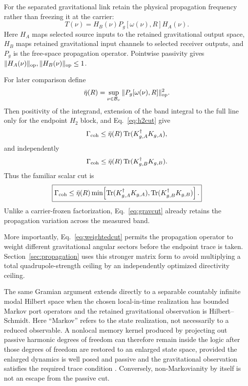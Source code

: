 For the separated gravitational link retain the physical propagation frequency rather than freezing it at the carrier:
\begin{equation}
T(\nu)=H_B(\nu)P_g[\omega(\nu),R]H_A(\nu).
\label{eq:factor}
\end{equation}
Here $H_A$ maps selected source inputs to the retained gravitational output space, $H_B$ maps retained gravitational input channels to selected receiver outputs, and $P_g$ is the free-space propagation operator. Pointwise passivity gives $\|H_A(\nu)\|_{\mathrm{op}},\|H_B(\nu)\|_{\mathrm{op}}\le1$.

For later comparison define
\begin{equation}
\bar\eta(R)
=\sup_{\nu\in\mathcal B_\nu}
\|P_g[\omega(\nu),R]\|_{\mathrm{op}}^2 .
\end{equation}
Then positivity of the integrand, extension of the band integral to the full line only for the endpoint $H_2$ block, and Eq.~\eqref{eq:h2cut} give
\begin{equation}
\Gamma_{\rm coh}
\le
\bar\eta(R)\operatorname{Tr}(K_{g,A}^\dagger K_{g,A}),
\end{equation}
and independently
\begin{equation}
\Gamma_{\rm coh}
\le
\bar\eta(R)\operatorname{Tr}(K_{g,B}^\dagger K_{g,B}).
\end{equation}
Thus the familiar scalar cut is
\begin{equation}
\boxed{
\Gamma_{\rm coh}
\le
\bar\eta(R)
\min\!\left[
\operatorname{Tr}(K_{g,A}^\dagger K_{g,A}),
\operatorname{Tr}(K_{g,B}^\dagger K_{g,B})
\right].
}
\label{eq:gravcut}
\end{equation}
Unlike a carrier-frozen factorization, Eq.~\eqref{eq:gravcut} already retains the propagation variation across the measured band.

More importantly, Eq.~\eqref{eq:weightedcut} permits the propagation operator to weight different gravitational angular sectors before the endpoint trace is taken. Section~\ref{sec:propagation} uses this stronger matrix form to avoid multiplying a total quadrupole-strength ceiling by an independently optimized directivity ceiling.

The same Gramian argument extends directly to a separable countably infinite modal Hilbert space when the chosen local-in-time realization has bounded Markov port operators and the retained gravitational observation is Hilbert--Schmidt. Here ``Markov'' refers to the state realization, not necessarily to a reduced observable. A nonlocal memory kernel produced by projecting out passive harmonic degrees of freedom can therefore remain inside the logic after those degrees of freedom are restored to an enlarged state space, provided the enlarged dynamics is well posed and passive and the gravitational observation satisfies the required trace condition \cite{Stella2014}. Conversely, non-Markovianity by itself is not an escape from the passive cut.

